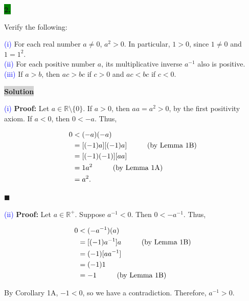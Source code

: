 \documentclass[12pt]{article}
\newcommand{\mybox}{%
    \collectbox{%
        \setlength{\fboxsep}{2pt}%
        \fbox{\BOXCONTENT}%
    }%
}
\begin{document}
\pagebreak

\noindent\mybox{\colorbox{green}{\textbf{2.}}}\hspace{3mm}\hrulefill

\noindent Verify the following:
\begin{flushleft}
\textcolor{blue}{(i)} For each real number $a\neq 0$, $a^2>0$. In particular, $1>0$, since $1\neq 0$ and $1 = 1^2$. \\
\textcolor{blue}{(ii)} For each positive number $a$, its multiplicative inverse $a^{-1}$ also is positive. \\
\textcolor{blue}{(iii)} If $a>b$, then $ac>bc$ if $c>0$ and $ac<bc$ if $c<0$.
\end{flushleft}

\vspace{5mm}

\noindent\mybox{\colorbox{lightgray}{\textbf{Solution}}} \hspace{3mm}\hrulefill

\noindent\textcolor{blue}{(i)} \textbf{Proof:} Let $a\in\mathbb{R}\setminus\lbrace 0 \rbrace.$ If $a>0$, then $aa = a^2 > 0$, by the first positivity axiom. If $a<0$, then $0<-a$. Thus, 

\begin{align*}
0 &< (-a)(-a) \\
&=[(-1)a][(-1)a] \hspace{10mm} \text{(by Lemma 1B)} \\
&=[(-1)(-1)][aa] \\
&= 1a^2 \hspace{10mm} \text{(by Lemma 1A)} \\
&= a^2.
\end{align*}


\hfill$\blacksquare$

\noindent\textcolor{blue}{(ii)} \textbf{Proof:} Let $a\in\mathbb{R}^{+}$. Suppose $a^{-1}<0.$ Then $0<-a^{-1}.$ Thus, 

\begin{align*}
0 &< (-a^{-1})(a) \\
&=[(-1)a^{-1}]a \hspace{10mm} \text{(by Lemma 1B)}\\
&= (-1)[aa^{-1}] \\ 
&= (-1)1 \\
&= -1 \hspace{10mm} \text{(by Lemma 1B)}
\end{align*}

\noindent By Corollary 1A, $-1<0$, so we have a contradiction. Therefore, $a^{-1}>0$.
\end{document}
